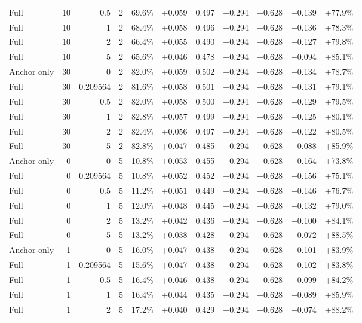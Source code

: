 \begin{table}[htbp]
\begin{tabular}{lrrrccccccc}
Full & 10 & 0.5 & 2 & 69.6\% & +0.059 & 0.497 & +0.294 & +0.628 & +0.139 & +77.9\% \\
Full & 10 & 1 & 2 & 68.4\% & +0.058 & 0.496 & +0.294 & +0.628 & +0.136 & +78.3\% \\
Full & 10 & 2 & 2 & 66.4\% & +0.055 & 0.490 & +0.294 & +0.628 & +0.127 & +79.8\% \\
Full & 10 & 5 & 2 & 65.6\% & +0.046 & 0.478 & +0.294 & +0.628 & +0.094 & +85.1\% \\
Anchor only & 30 & 0 & 2 & 82.0\% & +0.059 & 0.502 & +0.294 & +0.628 & +0.134 & +78.7\% \\
Full & 30 & 0.209564 & 2 & 81.6\% & +0.058 & 0.501 & +0.294 & +0.628 & +0.131 & +79.1\% \\
Full & 30 & 0.5 & 2 & 82.0\% & +0.058 & 0.500 & +0.294 & +0.628 & +0.129 & +79.5\% \\
Full & 30 & 1 & 2 & 82.8\% & +0.057 & 0.499 & +0.294 & +0.628 & +0.125 & +80.1\% \\
Full & 30 & 2 & 2 & 82.4\% & +0.056 & 0.497 & +0.294 & +0.628 & +0.122 & +80.5\% \\
Full & 30 & 5 & 2 & 82.8\% & +0.047 & 0.485 & +0.294 & +0.628 & +0.088 & +85.9\% \\
Anchor only & 0 & 0 & 5 & 10.8\% & +0.053 & 0.455 & +0.294 & +0.628 & +0.164 & +73.8\% \\
Full & 0 & 0.209564 & 5 & 10.8\% & +0.052 & 0.452 & +0.294 & +0.628 & +0.156 & +75.1\% \\
Full & 0 & 0.5 & 5 & 11.2\% & +0.051 & 0.449 & +0.294 & +0.628 & +0.146 & +76.7\% \\
Full & 0 & 1 & 5 & 12.0\% & +0.048 & 0.445 & +0.294 & +0.628 & +0.132 & +79.0\% \\
Full & 0 & 2 & 5 & 13.2\% & +0.042 & 0.436 & +0.294 & +0.628 & +0.100 & +84.1\% \\
Full & 0 & 5 & 5 & 13.2\% & +0.038 & 0.428 & +0.294 & +0.628 & +0.072 & +88.5\% \\
Anchor only & 1 & 0 & 5 & 16.0\% & +0.047 & 0.438 & +0.294 & +0.628 & +0.101 & +83.9\% \\
Full & 1 & 0.209564 & 5 & 15.6\% & +0.047 & 0.438 & +0.294 & +0.628 & +0.102 & +83.8\% \\
Full & 1 & 0.5 & 5 & 16.4\% & +0.046 & 0.438 & +0.294 & +0.628 & +0.099 & +84.2\% \\
Full & 1 & 1 & 5 & 16.4\% & +0.044 & 0.435 & +0.294 & +0.628 & +0.089 & +85.9\% \\
Full & 1 & 2 & 5 & 17.2\% & +0.040 & 0.429 & +0.294 & +0.628 & +0.074 & +88.2\% \\

\end{tabular}
\end{table}
